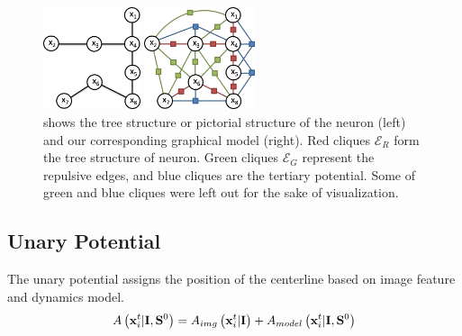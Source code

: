\documentclass{article}
\begin{document}
\begin{figure}[tb!]
	\vspace{-10pt}
	\centering
	\begin{minipage}[b]{0.49\linewidth}
		\centerline{\includegraphics[height=3cm]{img/neurontree.png}}
	\end{minipage}
	\begin{minipage}[b]{0.49\linewidth}
		\centerline{\includegraphics[height=3cm]{img/neuronmrf.png}}
	\end{minipage}
	\vspace{-10pt}
	\caption{\small{shows the tree structure or pictorial structure of the neuron (left) and our corresponding graphical model (right). Red cliques $\mathcal{E}_R$ form the tree structure of neuron. Green cliques $\mathcal{E}_G$ represent the repulsive edges, and blue cliques are the tertiary potential. Some of green and blue cliques were left out for the sake of visualization.}}
	\label{fig:sample_frame}
	\vspace{-10pt}
\end{figure}

\subsection{Unary Potential} \label{sec:unary_pot}
The unary potential assigns the position of the centerline based on image feature and dynamics model.
\begin{equation}
A\left( {\bf x}_i^t | {\bf I}, {\bf S}^0 \right) = A_{img}\left({\bf x}_i^t | {\bf I}\right) + A_{model}\left({\bf x}_i^t | {\bf I}, {\bf S}^0\right)
\end{equation}
\end{document}
